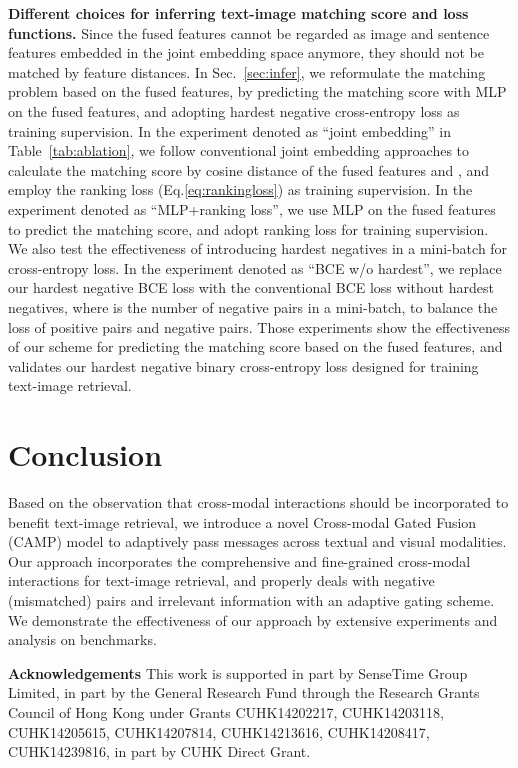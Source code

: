 \documentclass[10pt,twocolumn,letterpaper]{article}
\begin{document}
\noindent\textbf{Different choices for inferring text-image matching score and loss functions.}
Since the fused features cannot be regarded as image and sentence features embedded in the joint embedding space anymore, they should not be matched by feature distances. 
In Sec.~\ref{sec:infer}, we reformulate the matching problem based on the fused features, by predicting the matching score with MLP on the fused features, and adopting hardest negative cross-entropy loss as training supervision.
In the experiment denoted as ``joint embedding'' in Table~\ref{tab:ablation}, we follow conventional joint embedding approaches to calculate the matching score by cosine distance of the fused features  and , and employ the ranking loss (Eq.\eqref{eq:rankingloss}) as training supervision.
In the experiment denoted as ``MLP+ranking loss'', we use MLP on the fused features to predict the matching score, and adopt ranking loss for training supervision.
We also test the effectiveness of introducing hardest negatives in a mini-batch for cross-entropy loss. 
In the experiment denoted as ``BCE w/o hardest'', we replace our hardest negative BCE loss with the conventional BCE loss without hardest negatives,
where  is the number of negative pairs in a mini-batch, to balance the loss of positive pairs and negative pairs.
Those experiments show the effectiveness of our scheme for predicting the matching score based on the fused features, and validates our hardest negative binary cross-entropy loss designed for training text-image retrieval.










\vspace{-3mm}

\section{Conclusion} 
\vspace{-2mm}
Based on the observation that cross-modal interactions should be incorporated to benefit text-image retrieval, we introduce a novel Cross-modal Gated Fusion (CAMP) model to adaptively pass messages across textual and visual modalities. Our approach incorporates the comprehensive and fine-grained cross-modal interactions for text-image retrieval, and properly deals with negative (mismatched) pairs and irrelevant information with an adaptive gating scheme. We demonstrate the effectiveness of our approach by extensive experiments and analysis on benchmarks.
\vspace{1mm}

\noindent \textbf{Acknowledgements}
This work is supported in part by SenseTime Group Limited, in part by the General Research Fund through the Research Grants Council of Hong Kong under Grants CUHK14202217, CUHK14203118, CUHK14205615, CUHK14207814, CUHK14213616, CUHK14208417, CUHK14239816, in part by CUHK Direct Grant.

{\small


}
\end{document}
